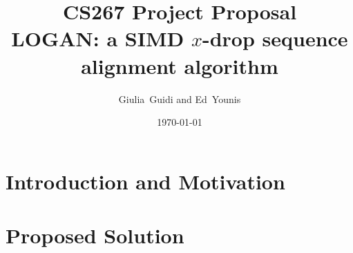 \documentclass[11pt,onecolumn]{article}
\title{CS267 Project Proposal \\ LOGAN: a SIMD $x$-drop sequence alignment algorithm
}
\author{Giulia~Guidi and Ed~Younis}
\date{
\today\\
}
\begin{document}
\maketitle
\section*{Introduction and Motivation}
\section*{Proposed Solution}


\end{document}
